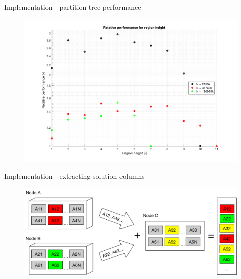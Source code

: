 \documentclass[c]{beamer}
\begin{document}

\begin{frame}{Implementation - partition tree performance}

   \begin{figure}
      \centering
      \includegraphics[width=1\textwidth]{img/regionHeightBig.png}
    \end{figure}

\end{frame}


\begin{frame}{Implementation - extracting solution columns}

   \begin{figure}
      \centering
      \includegraphics[width=1\textwidth]{img/mapreduce.png}
    \end{figure}

\end{frame}

\end{document}
